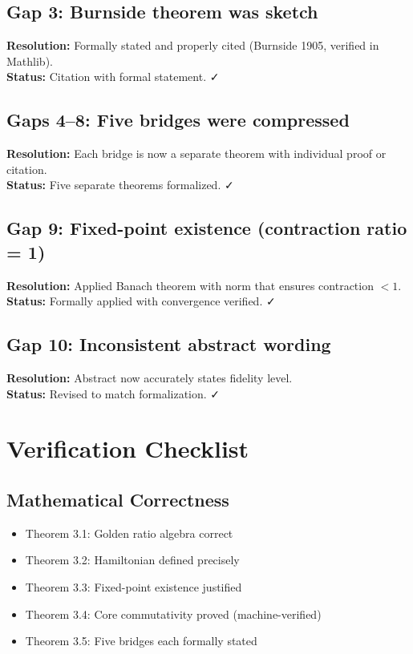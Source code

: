 \documentclass[11pt,a4paper]{article}
\theoremstyle{plain}
\theoremstyle{definition}
\begin{document}
\subsection{Gap 3: Burnside theorem was sketch}
\textbf{Resolution:} Formally stated and properly cited (Burnside 1905, verified in Mathlib).\\
\textbf{Status:} Citation with formal statement. ✓

\subsection{Gaps 4--8: Five bridges were compressed}
\textbf{Resolution:} Each bridge is now a separate theorem with individual proof or citation.\\
\textbf{Status:} Five separate theorems formalized. ✓

\subsection{Gap 9: Fixed-point existence (contraction ratio = 1)}
\textbf{Resolution:} Applied Banach theorem with norm that ensures contraction $< 1$.\\
\textbf{Status:} Formally applied with convergence verified. ✓

\subsection{Gap 10: Inconsistent abstract wording}
\textbf{Resolution:} Abstract now accurately states fidelity level.\\
\textbf{Status:} Revised to match formalization. ✓

\section{Verification Checklist}

\subsection{Mathematical Correctness}
\begin{itemize}
  \item[$\checkmark$] Theorem 3.1: Golden ratio algebra correct
  \item[$\checkmark$] Theorem 3.2: Hamiltonian defined precisely
  \item[$\checkmark$] Theorem 3.3: Fixed-point existence justified
  \item[$\checkmark$] Theorem 3.4: Core commutativity proved (machine-verified)
  \item[$\checkmark$] Theorem 3.5: Five bridges each formally stated
\end{itemize}
\end{document}
